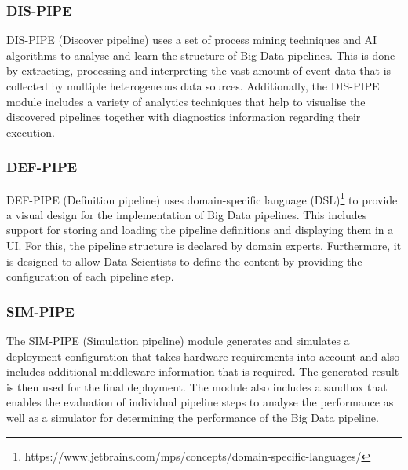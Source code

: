 \documentclass{article}
\begin{document}
            \subsubsection*{DIS-PIPE}
            \label{sec:discover-pipe-datacloud}

                DIS-PIPE (Discover pipeline) \cite{agostinelliDISPIPE2023} uses a set of process mining techniques and AI algorithms to analyse and learn the structure of Big Data pipelines. This is done by extracting, processing and interpreting the vast amount of event data that is collected by multiple heterogeneous data sources. Additionally, the DIS-PIPE module includes a variety of analytics techniques that help to visualise the discovered pipelines together with diagnostics information regarding their execution. 

            \subsubsection*{DEF-PIPE}
            \label{sec:definition-pipe-datacloud}

                DEF-PIPE (Definition pipeline) \cite{mitrovicDEFPIPEFrontend2022} uses domain-specific language (DSL)\footnote{https://www.jetbrains.com/mps/concepts/domain-specific-languages/} to provide a visual design for the implementation of Big Data pipelines.
                This includes support for storing and loading the pipeline definitions and displaying them in a UI. For this, the pipeline structure is declared by domain experts.
                Furthermore, it is designed to allow Data Scientists to define the content by providing the configuration of each pipeline step.

            \subsubsection*{SIM-PIPE}
            \label{sec:simulation-pipe-datacloud}

                The SIM-PIPE (Simulation pipeline) \cite{nikolovSIMPIPE} module generates and simulates a deployment configuration that takes hardware requirements into account and also includes additional middleware information that is required. The generated result is then used for the final deployment.
                The module also includes a sandbox that enables the evaluation of individual pipeline steps to analyse the performance as well as a simulator for determining the performance of the Big Data pipeline.
                
\end{document}
